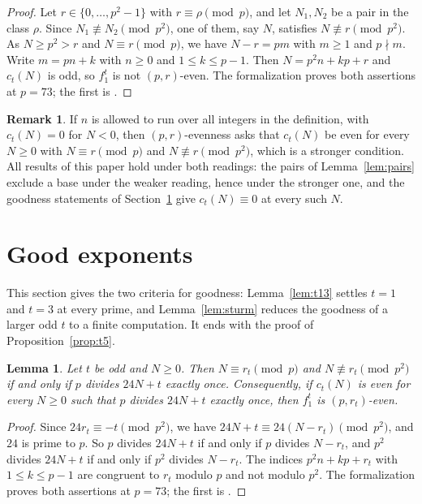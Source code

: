 \documentclass[12pt]{amsart}
\newtheorem{lemma}[theorem]{Lemma}
\theoremstyle{definition}
\newtheorem{remark}[theorem]{Remark}
\newcommand{\lean}[1]{\ignorespaces}
\newcommand{\notlean}[1]{\ignorespaces}
\begin{document}
\begin{proof}
Let $r\in\{0,\dots,p^2-1\}$ with $r\equiv\rho\pmod p$, and let $N_1,N_2$ be a pair in the class $\rho$. Since $N_1\not\equiv N_2\pmod{p^2}$, one of them, say $N$, satisfies $N\not\equiv r\pmod{p^2}$. As $N\ge p^2>r$ and $N\equiv r\pmod p$, we have $N-r=pm$ with $m\ge1$ and $p\nmid m$. Write $m=pn+k$ with $n\ge0$ and $1\le k\le p-1$. Then $N=p^2n+kp+r$ and $c_t(N)$ is odd, so $f_1^t$ is not $(p,r)$-even. The formalization proves both assertions at $p=73$; the first is .
\end{proof}

\begin{remark}\label{rem:reading}
\notlean{the definition \decl{KeithZanello.IsEvenWithBase} takes $n\ge0$}
If $n$ is allowed to run over all integers in the definition, with $c_t(N)=0$ for $N<0$, then $(p,r)$-evenness asks that $c_t(N)$ be even for every $N\ge0$ with $N\equiv r\pmod p$ and $N\not\equiv r\pmod{p^2}$, which is a stronger condition. All results of this paper hold under both readings: the pairs of Lemma~\ref{lem:pairs} exclude a base under the weaker reading, hence under the stronger one, and the goodness statements of Section~\ref{sec:good} give $c_t(N)\equiv0$ at every such $N$.
\end{remark}

\section{Good exponents}\label{sec:good}

This section gives the two criteria for goodness: Lemma~\ref{lem:t13} settles $t=1$ and $t=3$ at every prime, and Lemma~\ref{lem:sturm} reduces the goodness of a larger odd $t$ to a finite computation. It ends with the proof of Proposition~\ref{prop:t5}.

\begin{lemma}\label{lem:rt}
\lean{\decl{KeithZanello.index_iff}, at $p=73$; the consequence is \decl{KeithZanello.evenWithBase_rt_of_condG}}
Let $t$ be odd and $N\ge0$. Then $N\equiv r_t\pmod p$ and $N\not\equiv r_t\pmod{p^2}$ if and only if $p$ divides $24N+t$ exactly once. Consequently, if $c_t(N)$ is even for every $N\ge0$ such that $p$ divides $24N+t$ exactly once, then $f_1^t$ is $(p,r_t)$-even.
\end{lemma}

\begin{proof}
Since $24r_t\equiv-t\pmod{p^2}$, we have $24N+t\equiv24(N-r_t)\pmod{p^2}$, and $24$ is prime to $p$. So $p$ divides $24N+t$ if and only if $p$ divides $N-r_t$, and $p^2$ divides $24N+t$ if and only if $p^2$ divides $N-r_t$. The indices $p^2n+kp+r_t$ with $1\le k\le p-1$ are congruent to $r_t$ modulo $p$ and not modulo $p^2$. The formalization proves both assertions at $p=73$; the first is .
\end{proof}
\end{document}
